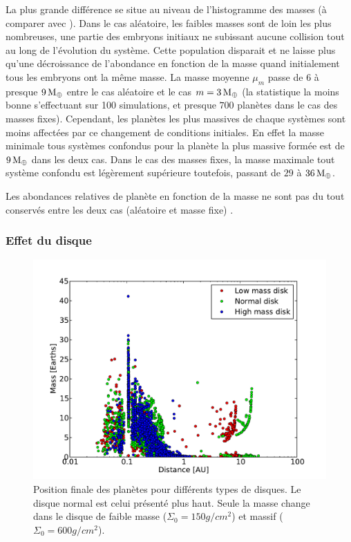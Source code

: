 La plus grande différence se situe au niveau de l'histogramme des masses  (à comparer avec ). Dans le cas aléatoire, les faibles masses sont de loin les plus nombreuses, une partie des embryons initiaux ne subissant aucune collision tout au long de l'évolution du système. Cette population disparait et ne laisse plus qu'une décroissance de l'abondance en fonction de la masse quand initialement tous les embryons ont la même masse. La masse moyenne $\mu_m$ passe de $6$ à presque $9\mathrm{\thinspace M_\oplus}$ entre le cas aléatoire et le cas $m=3\mathrm{\thinspace M_\oplus}$ (la statistique la moins bonne s'effectuant sur 100 simulations, et presque $700$ planètes dans le cas des masses fixes). Cependant, les planètes les plus massives de chaque systèmes sont moins affectées par ce changement de conditions initiales. En effet la masse minimale tous systèmes confondus pour la planète la plus massive formée est de $9\mathrm{\thinspace M_\oplus}$ dans les deux cas. Dans le cas des masses fixes, la masse maximale tout système confondu est légèrement supérieure toutefois, passant de $29$ à $36\mathrm{\thinspace M_\oplus}$. 

Les abondances relatives de planète en fonction de la masse ne sont pas du tout conservés entre les deux cas (aléatoire et masse fixe) .

\bigskip


\subsubsection{Effet du disque}
\begin{figure}[htbp]
\centering
\includegraphics[width=0.8\linewidth]{figure/HSE/HSE_disk_effect.pdf}
\caption{Position finale des planètes pour différents types de disques. Le disque normal est celui présenté plus haut. Seule la masse change dans le disque de faible masse ($\Sigma_0=150\unit{g/cm^2}$) et massif ($\Sigma_0=600\unit{g/cm^2}$).}\label{fig:HSE_disk_effect}
\end{figure}

